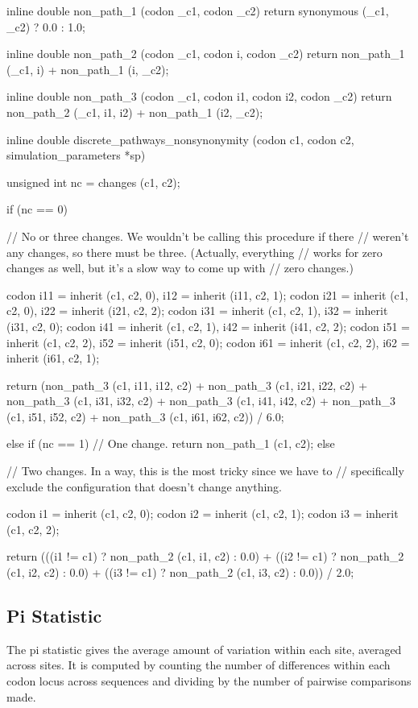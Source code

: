 \documentclass{article}
\begin{document}
\begin{ccode}
inline double non_path_1 (codon _c1, codon _c2)
  {return synonymous (_c1, _c2) ? 0.0 : 1.0;}

inline double non_path_2 (codon _c1, codon i, codon _c2)
  {return non_path_1 (_c1, i) + non_path_1 (i, _c2);}

inline double non_path_3 (codon _c1, codon i1, codon i2, codon _c2)
  {return non_path_2 (_c1, i1, i2) + non_path_1 (i2, _c2);}

inline double discrete_pathways_nonsynonymity (codon c1, codon c2, simulation_parameters *sp) {
  unsigned int nc = changes (c1, c2);

  if (nc == 0) {
    // No or three changes. We wouldn't be calling this procedure if there
    // weren't any changes, so there must be three. (Actually, everything
    // works for zero changes as well, but it's a slow way to come up with
    // zero changes.)

    codon i11 = inherit (c1, c2, 0), i12 = inherit (i11, c2, 1);
    codon i21 = inherit (c1, c2, 0), i22 = inherit (i21, c2, 2);
    codon i31 = inherit (c1, c2, 1), i32 = inherit (i31, c2, 0);
    codon i41 = inherit (c1, c2, 1), i42 = inherit (i41, c2, 2);
    codon i51 = inherit (c1, c2, 2), i52 = inherit (i51, c2, 0);
    codon i61 = inherit (c1, c2, 2), i62 = inherit (i61, c2, 1);

    return (non_path_3 (c1, i11, i12, c2) + non_path_3 (c1, i21, i22, c2) +
	    non_path_3 (c1, i31, i32, c2) + non_path_3 (c1, i41, i42, c2) +
	    non_path_3 (c1, i51, i52, c2) + non_path_3 (c1, i61, i62, c2)) / 6.0;
  } else if (nc == 1)
    // One change.
    return non_path_1 (c1, c2);
  else {
    // Two changes. In a way, this is the most tricky since we have to
    // specifically exclude the configuration that doesn't change anything.

    codon i1 = inherit (c1, c2, 0);
    codon i2 = inherit (c1, c2, 1);
    codon i3 = inherit (c1, c2, 2);

    return (((i1 != c1) ? non_path_2 (c1, i1, c2) : 0.0) +
	    ((i2 != c1) ? non_path_2 (c1, i2, c2) : 0.0) +
	    ((i3 != c1) ? non_path_2 (c1, i3, c2) : 0.0)) / 2.0;
  }
}
\end{ccode}

    \subsection{Pi Statistic}
      \label{sec:pi-statistic}

      The pi statistic gives the average amount of variation within each site,
      averaged across sites. It is computed by counting the number of
      differences within each codon locus across sequences and dividing by the
      number of pairwise comparisons made.
\end{document}
